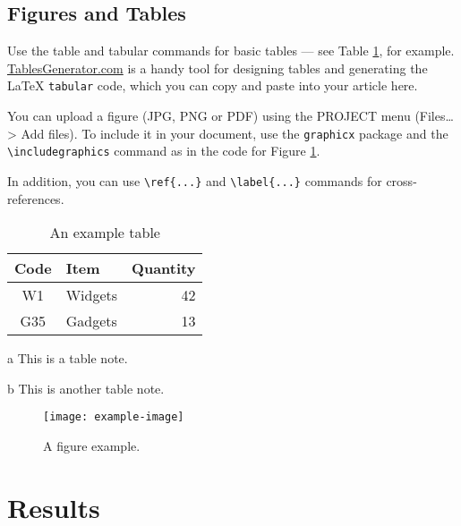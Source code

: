 \documentclass{biophys-new}
\begin{document}
\subsection*{Figures and Tables}

Use the table and tabular commands for basic tables --- see Table \ref{tab:widgets}, for example. \href{http://tablesgenerator.com}{TablesGenerator.com} is a handy tool for designing tables and generating the \LaTeX{} \texttt{tabular} code, which you can copy and paste into your article here.

You can upload a figure (JPG, PNG or PDF) using the PROJECT menu (Files\ldots > Add files). To include it in your document, use the \verb|graphicx| package and the \verb|\includegraphics| command as in the code for Figure \ref{fig:view}. 

In addition, you can use \verb|\ref{...}| and \verb|\label{...}| commands for cross-references.

\begin{table}[hbt!]
\caption{An example table}
\label{tab:widgets}
\centering

\begin{threeparttable}

\begin{tabular}{c l r}
\hline
Code & Item & Quantity \\\hline
W1 & Widgets\tnote{a} & 42 \\
G35 & Gadgets & 13\tnote{b} \\
\hline
\end{tabular}

\begin{tablenotes}
\item[a] This is a table note.
\item[b] This is another table note.
\end{tablenotes}

\end{threeparttable}

\end{table}

\begin{figure}[hbt!]
\centering
\texttt{[image: example-image]}
\caption{A figure example.}
\label{fig:view}

\end{figure}

\section*{Results}
\end{document}

